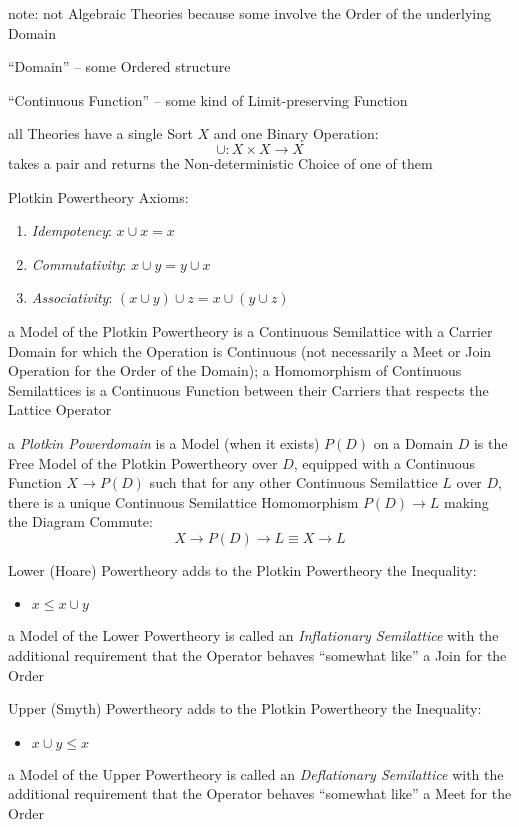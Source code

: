 \fist note: not Algebraic Theories because some involve the Order of
the underlying Domain %

``Domain'' -- some Ordered structure

``Continuous Function'' -- some kind of Limit-preserving Function

all Theories have a single Sort $X$ and one Binary Operation:
\[
  \cup : X \times X \rightarrow X
\]
takes a pair and returns the Non-deterministic Choice of one of them

Plotkin Powertheory Axioms:
\begin{enumerate}
  \item \emph{Idempotency}: $x \cup x = x$
  \item \emph{Commutativity}: $x \cup y = y \cup x$
  \item \emph{Associativity}: $(x \cup y) \cup z = x \cup (y \cup z)$
\end{enumerate}
a Model of the Plotkin Powertheory is a Continuous Semilattice with a
Carrier Domain for which the Operation is Continuous (not necessarily
a Meet or Join Operation for the Order of the Domain); a Homomorphism
of Continuous Semilattices is a Continuous Function between their
Carriers that respects the Lattice Operator

a \emph{Plotkin Powerdomain} is a Model (when it exists) $P(D)$ on a
Domain $D$ is the Free Model of the Plotkin Powertheory over $D$,
equipped with a Continuous Function $X \rightarrow P(D)$ such that for
any other Continuous Semilattice $L$ over $D$, there is a unique
Continuous Semilattice Homomorphism $P(D) \rightarrow L$ making the
Diagram Commute:
\[
  X \rightarrow P(D) \rightarrow L \equiv X \rightarrow L
\]

Lower (Hoare) Powertheory adds to the Plotkin Powertheory the
Inequality:
\begin{itemize}
  \item $x \leq x \cup y$
\end{itemize}
a Model of the Lower Powertheory is called an \emph{Inflationary
  Semilattice} with the additional requirement that the Operator
behaves ``somewhat like'' a Join for the Order %

Upper (Smyth) Powertheory adds to the Plotkin Powertheory the
Inequality:
\begin{itemize}
  \item $x \cup y \leq x$
\end{itemize}
a Model of the Upper Powertheory is called an \emph{Deflationary
  Semilattice} with the additional requirement that the Operator
behaves ``somewhat like'' a Meet for the Order %


